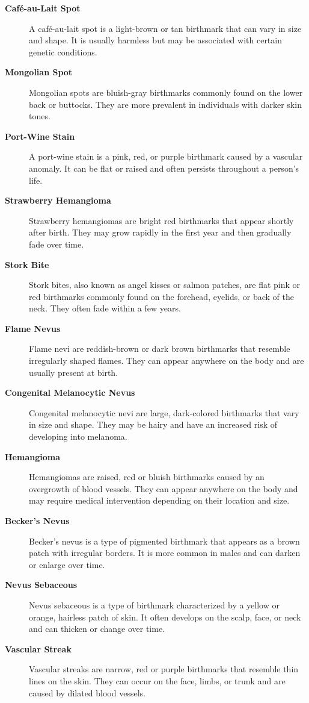 \begin{description}
    \item[\textbf{Café-au-Lait Spot}] A café-au-lait spot is a light-brown or tan birthmark that can vary in size and shape. It is usually harmless but may be associated with certain genetic conditions.
    \item[\textbf{Mongolian Spot}] Mongolian spots are bluish-gray birthmarks commonly found on the lower back or buttocks. They are more prevalent in individuals with darker skin tones.
    \item[\textbf{Port-Wine Stain}] A port-wine stain is a pink, red, or purple birthmark caused by a vascular anomaly. It can be flat or raised and often persists throughout a person's life.
    \item[\textbf{Strawberry Hemangioma}] Strawberry hemangiomas are bright red birthmarks that appear shortly after birth. They may grow rapidly in the first year and then gradually fade over time.
    \item[\textbf{Stork Bite}] Stork bites, also known as angel kisses or salmon patches, are flat pink or red birthmarks commonly found on the forehead, eyelids, or back of the neck. They often fade within a few years.
    \item[\textbf{Flame Nevus}] Flame nevi are reddish-brown or dark brown birthmarks that resemble irregularly shaped flames. They can appear anywhere on the body and are usually present at birth.
    \item[\textbf{Congenital Melanocytic Nevus}] Congenital melanocytic nevi are large, dark-colored birthmarks that vary in size and shape. They may be hairy and have an increased risk of developing into melanoma.
    \item[\textbf{Hemangioma}] Hemangiomas are raised, red or bluish birthmarks caused by an overgrowth of blood vessels. They can appear anywhere on the body and may require medical intervention depending on their location and size.
    \item[\textbf{Becker's Nevus}] Becker's nevus is a type of pigmented birthmark that appears as a brown patch with irregular borders. It is more common in males and can darken or enlarge over time.
    \item[\textbf{Nevus Sebaceous}] Nevus sebaceous is a type of birthmark characterized by a yellow or orange, hairless patch of skin. It often develops on the scalp, face, or neck and can thicken or change over time.
    \item[\textbf{Vascular Streak}] Vascular streaks are narrow, red or purple birthmarks that resemble thin lines on the skin. They can occur on the face, limbs, or trunk and are caused by dilated blood vessels.
\end{description}

